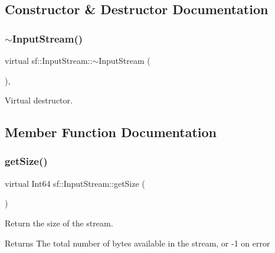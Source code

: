 \subsection{Constructor \& Destructor Documentation}
\mbox{\label{classsf_1_1_input_stream_a4b2eb0f92323e630bd0542bc6191682e}} 
\subsubsection{\texorpdfstring{$\sim$InputStream()}{~InputStream()}}
{\footnotesize\ttfamily virtual sf\+::\+Input\+Stream\+::$\sim$\+Input\+Stream (\begin{DoxyParamCaption}{ }\end{DoxyParamCaption})\hspace{0.3cm}{\ttfamily [inline]}, {\ttfamily [virtual]}}



Virtual destructor. 

\begin{DoxyVerb}\end{DoxyVerb}
 

\subsection{Member Function Documentation}
\mbox{\label{classsf_1_1_input_stream_a311eaaaa65d636728e5153b574b72d5d}} 
\subsubsection{\texorpdfstring{getSize()}{getSize()}}
{\footnotesize\ttfamily virtual Int64 sf\+::\+Input\+Stream\+::get\+Size (\begin{DoxyParamCaption}{ }\end{DoxyParamCaption})\hspace{0.3cm}{\ttfamily [pure virtual]}}



Return the size of the stream. 

\begin{DoxyReturn}{Returns}
The total number of bytes available in the stream, or -\/1 on error \begin{DoxyVerb}\end{DoxyVerb}
 
\end{DoxyReturn}


